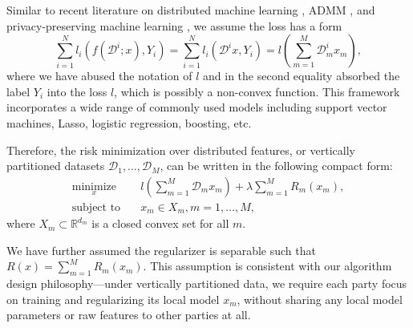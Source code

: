 Similar to recent literature on distributed machine learning \cite{ying2018supervised, zhou2016convergence}, ADMM \cite{zhang2016dual, zhang2018improving}, and privacy-preserving machine learning \cite{chaudhuri2011differentially, hamm2016learning}, we assume the loss has a form
\[
\sum_{i=1}^{N}l_i(f(\mathcal{D}^i; x), Y_i) = \sum_{i=1}^{N}l_i(\mathcal{D}^i x, Y_i)
=l\left(\sum_{m=1}^{M} \mathcal{D}_m^i x_m\right),
\]
where we have abused the notation of $l$ and in the second equality absorbed the label $Y_i$ into the loss $l$, which is possibly a non-convex function.
This framework incorporates a wide range of commonly used models including support vector machines, Lasso, logistic regression, boosting, etc.





Therefore, the risk minimization over distributed features, or vertically partitioned datasets $\mathcal D_1,\ldots,\mathcal D_M$, can be written in the following compact form:
\begin{align}
\underset{x}{\text{minimize}}&\quad l\left(\sum_{m=1}^{M} \mathcal{D}_mx_m\right) + \lambda\sum_{m=1}^{M} R_m(x_m), \label{eq:analysis_problem}\\
\text{subject to}&\quad x_m\in X_m, m=1,\ldots,M,
\end{align}
where  $X_m\subset\mathbb{R}^{d_m}$ is a closed convex set for all $m$.

We have further assumed the regularizer is separable such that
$R(x) = \sum_{m=1}^{M} R_m(x_m).$ This assumption is consistent with our algorithm design philosophy---under vertically partitioned data, we require each party focus on training and regularizing its local model $x_m$, without sharing any local model parameters or raw features to other parties at all. 